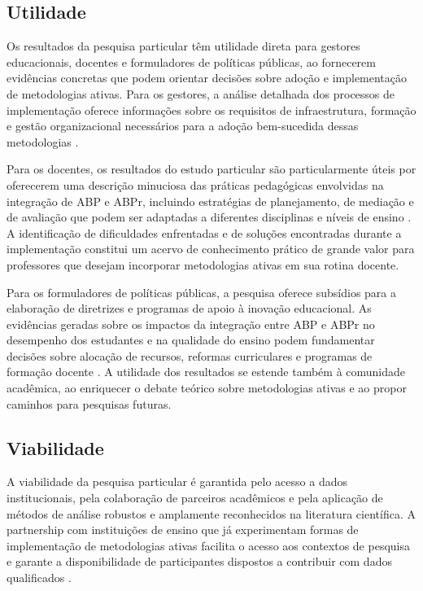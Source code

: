 \subsection{Utilidade}
\label{subsec:jp_utilidade}

Os resultados da pesquisa particular têm utilidade direta para gestores educacionais, docentes e formuladores de políticas públicas, ao fornecerem evidências concretas que podem orientar decisões sobre adoção e implementação de metodologias ativas. Para os gestores, a análise detalhada dos processos de implementação oferece informações sobre os requisitos de infraestrutura, formação e gestão organizacional necessários para a adoção bem-sucedida dessas metodologias \cite{OLIVEIRA2023}.

Para os docentes, os resultados do estudo particular são particularmente úteis por oferecerem uma descrição minuciosa das práticas pedagógicas envolvidas na integração de ABP e ABPr, incluindo estratégias de planejamento, de mediação e de avaliação que podem ser adaptadas a diferentes disciplinas e níveis de ensino \cite{RIOS2026}. A identificação de dificuldades enfrentadas e de soluções encontradas durante a implementação constitui um acervo de conhecimento prático de grande valor para professores que desejam incorporar metodologias ativas em sua rotina docente.

Para os formuladores de políticas públicas, a pesquisa oferece subsídios para a elaboração de diretrizes e programas de apoio à inovação educacional. As evidências geradas sobre os impactos da integração entre ABP e ABPr no desempenho dos estudantes e na qualidade do ensino podem fundamentar decisões sobre alocação de recursos, reformas curriculares e programas de formação docente \cite{MACHADO2025}. A utilidade dos resultados se estende também à comunidade acadêmica, ao enriquecer o debate teórico sobre metodologias ativas e ao propor caminhos para pesquisas futuras.

\subsection{Viabilidade}
\label{subsec:jp_viabilidade}

A viabilidade da pesquisa particular é garantida pelo acesso a dados institucionais, pela colaboração de parceiros acadêmicos e pela aplicação de métodos de análise robustos e amplamente reconhecidos na literatura científica. A partnership com instituições de ensino que já experimentam formas de implementação de metodologias ativas facilita o acesso aos contextos de pesquisa e garante a disponibilidade de participantes dispostos a contribuir com dados qualificados \cite{MACIEL2018}.

